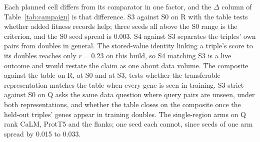 Each planned cell differs from its comparator in one factor, and the $\Delta$ column of
Table~\ref{tab:campaign} is that difference.
S3 against S0 on R with the table tests whether added fitness records help; three seeds
all above the S0 range is the criterion, and the S0 seed spread is 0.003.
S4 against S3 separates the triples' own pairs from doubles in general. The stored-value
identity linking a triple's score to its doubles reaches only $r = 0.23$ on this build, so
S4 matching S3 is a live outcome and would restate the claim as one about data volume.
The composite against the table on R, at S0 and at S3, tests whether the transferable
representation matches the table when every gene is seen in training.
S3 strict against S0 on Q asks the same data question where query pairs are unseen, under
both representations, and whether the table closes on the composite once the held-out
triples' genes appear in training doubles.
The single-region arms on Q rank CaLM, ProtT5 and the flanks; one seed each cannot, since
seeds of one arm spread by 0.015 to 0.033.
